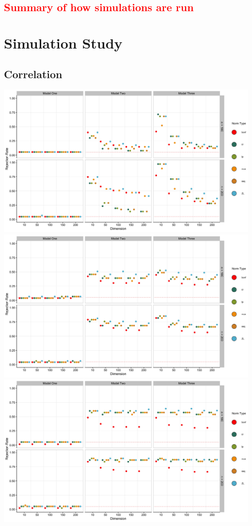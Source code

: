 \documentclass{article}
\newcommand{\sh}{\textcolor{red}}
\begin{document}
\sh{\subsection{Summary of how simulations are run}}

\section{Simulation Study}
\label{sec:sim_stdy}
\subsection{Correlation}
\includegraphics[width = \linewidth]{uncor.jpg}
\includegraphics[width = \linewidth]{some_core.jpg}
\includegraphics[width = \linewidth]{lots_cor.jpg}
\end{document}

